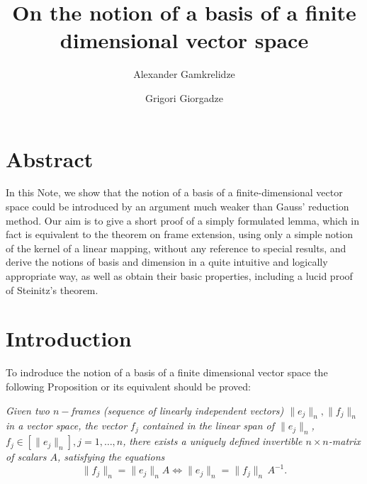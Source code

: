 \documentclass[]{amsart}
\begin{document}





















\title{On the notion  of a basis of a finite dimensional vector space}

\author{Alexander Gamkrelidze}
\address{Department of Computer Science\\
I. Javakhishvili Tbilisi State University\\
Georgia
}
\author{Grigori Giorgadze}
\address{Department of Mathematics\\
I. Javakhishvili Tbilisi State University\\
Georgia}


\date{}


\maketitle


 \section*{Abstract}
In this Note, we show that the notion of a basis of a finite-dimensional vector space could be introduced by an argument much weaker than Gauss' reduction method. Our aim is to give a short proof of a simply formulated lemma, which in fact is equivalent to the theorem on frame extension, using only a simple notion of the kernel of a linear mapping, without any reference to special results, and derive the notions of basis and dimension in a quite intuitive and logically appropriate way, as well as obtain their basic properties, including a lucid proof of Steinitz's theorem.



 \section{Introduction}
 To indroduce the notion of a basis of a finite dimensional vector space the 
following Proposition or its equivalent should be proved:

\emph{Given two $n-$frames
(sequence of linearly independent vectors) 
 $\|e_j\|_n, \|f_j\|_n$  in a vector space, the vector
$f_j$ contained in the linear span of $\|e_j\|_n$, $f_j\in [\|e_j\|_n], j=1,\ldots,n$,} 
\emph{there exists a uniquely defined}  \emph{invertible  $n\times n$-matrix of scalars $A$, satisfying  the equations}
\[
  \|f_j\|_n=\|e_j\|_nA \iff \|e_j\|_n=\|f_j\|_n \,A^{-1}. 
\]
\end{document}
